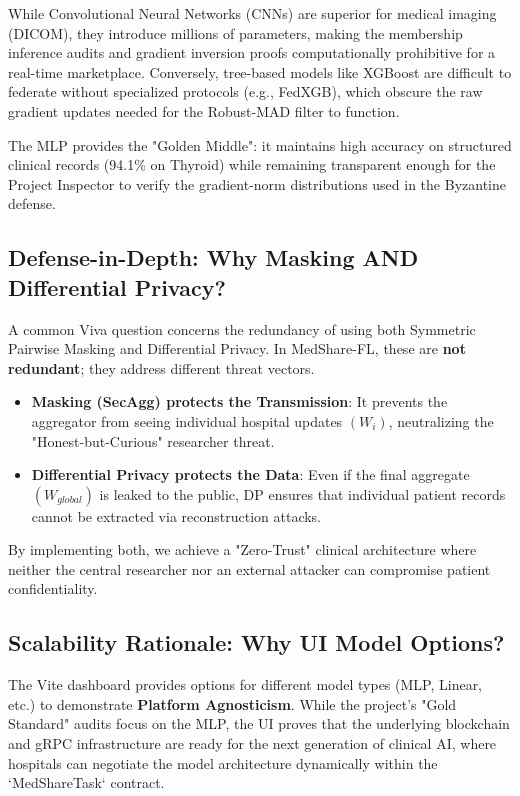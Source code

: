 \documentclass[10pt, a4paper, twocolumn]{article}
\begin{document}
While Convolutional Neural Networks (CNNs) are superior for medical imaging (DICOM), they introduce millions of parameters, making the membership inference audits and gradient inversion proofs computationally prohibitive for a real-time marketplace. Conversely, tree-based models like XGBoost are difficult to federate without specialized protocols (e.g., FedXGB), which obscure the raw gradient updates needed for the Robust-MAD filter to function. 

The MLP provides the "Golden Middle": it maintains high accuracy on structured clinical records (94.1\% on Thyroid) while remaining transparent enough for the Project Inspector to verify the gradient-norm distributions used in the Byzantine defense.

\subsection{Defense-in-Depth: Why Masking AND Differential Privacy?}
A common Viva question concerns the redundancy of using both Symmetric Pairwise Masking and Differential Privacy. In MedShare-FL, these are \textbf{not redundant}; they address different threat vectors.

\begin{itemize}
    \item \textbf{Masking (SecAgg) protects the Transmission}: It prevents the aggregator from seeing individual hospital updates $(W_i)$, neutralizing the "Honest-but-Curious" researcher threat.
    \item \textbf{Differential Privacy protects the Data}: Even if the final aggregate $(W_{global})$ is leaked to the public, DP ensures that individual patient records cannot be extracted via reconstruction attacks.
\end{itemize}

By implementing both, we achieve a "Zero-Trust" clinical architecture where neither the central researcher nor an external attacker can compromise patient confidentiality.

\subsection{Scalability Rationale: Why UI Model Options?}
The Vite dashboard provides options for different model types (MLP, Linear, etc.) to demonstrate \textbf{Platform Agnosticism}. While the project's "Gold Standard" audits focus on the MLP, the UI proves that the underlying blockchain and gRPC infrastructure are ready for the next generation of clinical AI, where hospitals can negotiate the model architecture dynamically within the `MedShareTask` contract.
\end{document}
